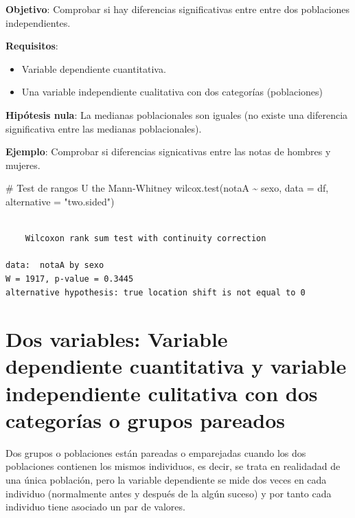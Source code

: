 \documentclass[
  a4paper,
]{scrreport}
\newenvironment{Shaded}{\begin{snugshade}}{\end{snugshade}}
\newcommand{\AttributeTok}[1]{\textcolor[rgb]{0.40,0.45,0.13}{#1}}
\newcommand{\CommentTok}[1]{\textcolor[rgb]{0.37,0.37,0.37}{#1}}
\newcommand{\FunctionTok}[1]{\textcolor[rgb]{0.28,0.35,0.67}{#1}}
\newcommand{\NormalTok}[1]{\textcolor[rgb]{0.00,0.23,0.31}{#1}}
\newcommand{\SpecialCharTok}[1]{\textcolor[rgb]{0.37,0.37,0.37}{#1}}
\newcommand{\StringTok}[1]{\textcolor[rgb]{0.13,0.47,0.30}{#1}}
\providecommand{\tightlist}{%
  \setlength{\itemsep}{0pt}\setlength{\parskip}{0pt}}\usepackage{longtable,booktabs,array}
\theoremstyle{definition}
\theoremstyle{definition}
\theoremstyle{remark}
\begin{document}
\textbf{Objetivo}: Comprobar si hay diferencias significativas entre
entre dos poblaciones independientes.

\textbf{Requisitos}:

\begin{itemize}
\tightlist
\item
  Variable dependiente cuantitativa.
\item
  Una variable independiente cualitativa con dos categorías
  (poblaciones)
\end{itemize}

\textbf{Hipótesis nula}: La medianas poblacionales son iguales (no
existe una diferencia significativa entre las medianas poblacionales).

\textbf{Ejemplo}: Comprobar si diferencias signicativas entre las notas
de hombres y mujeres.

\begin{Shaded}
\begin{Highlighting}[]
\CommentTok{\# Test de rangos U the Mann{-}Whitney}
\FunctionTok{wilcox.test}\NormalTok{(notaA }\SpecialCharTok{\textasciitilde{}}\NormalTok{ sexo, }\AttributeTok{data =}\NormalTok{ df, }\AttributeTok{alternative =} \StringTok{"two.sided"}\NormalTok{)}
\end{Highlighting}
\end{Shaded}

\begin{verbatim}

    Wilcoxon rank sum test with continuity correction

data:  notaA by sexo
W = 1917, p-value = 0.3445
alternative hypothesis: true location shift is not equal to 0
\end{verbatim}

\hypertarget{dos-variables-variable-dependiente-cuantitativa-y-variable-independiente-culitativa-con-dos-categoruxedas-o-grupos-pareados}{%
\section{Dos variables: Variable dependiente cuantitativa y variable
independiente culitativa con dos categorías o grupos
pareados}\label{dos-variables-variable-dependiente-cuantitativa-y-variable-independiente-culitativa-con-dos-categoruxedas-o-grupos-pareados}}

Dos grupos o poblaciones están pareadas o emparejadas cuando los dos
poblaciones contienen los mismos individuos, es decir, se trata en
realidadad de una única población, pero la variable dependiente se mide
dos veces en cada individuo (normalmente antes y después de la algún
suceso) y por tanto cada individuo tiene asociado un par de valores.
\end{document}
